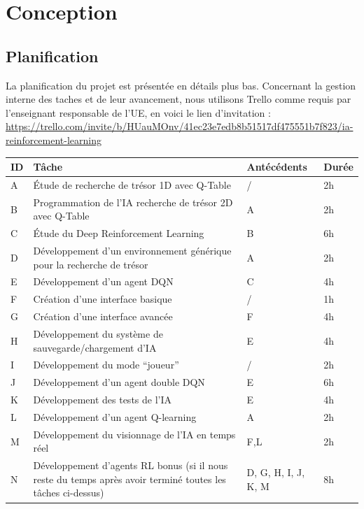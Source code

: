 \chapter{Conception}


\section{Planification}

La planification du projet est présentée en détails plus bas. Concernant la gestion interne des taches et de leur avancement, nous utilisons Trello comme requis par l'enseignant responsable de l'UE, en voici le lien d'invitation : \\ \url{https://trello.com/invite/b/HUauMOnv/41ec23e7edb8b51517df475551b7f823/ia-reinforcement-learning}


\begin{center}
\begin{tabularx}{\linewidth}{|p{1cm}|X|p{2.1cm}|p{1cm}|}
    \hline
    ID & Tâche & Antécédents & Durée \\
    \hline
    \hline
    A & Étude de recherche de trésor 1D avec Q-Table & / & 2h \\
    \hline
    B & Programmation de l'IA recherche de trésor 2D avec Q-Table& A & 2h \\
    \hline
    C & Étude du Deep Reinforcement Learning & B & 6h \\
    \hline
    D & Développement d’un environnement générique pour la recherche de trésor & A & 2h \\
    \hline
    E & Développement d’un agent DQN & C & 4h \\
    \hline
    F & Création d’une interface basique & / & 1h \\
    \hline
    G & Création d’une interface avancée & F & 4h \\
    \hline
    H & Développement du système de sauvegarde/chargement d’IA & E & 4h \\
    \hline
    I & Développement du mode ``joueur'' & / & 2h \\
    \hline
    J & Développement d’un agent double DQN & E & 6h \\
    \hline
    K & Développement des tests de l’IA & E & 4h \\
    \hline
    L & Développement d’un agent Q-learning & A & 2h \\
    \hline
    M & Développement du visionnage de l’IA en temps réel & F,L & 2h \\
    \hline
    N & Développement d’agents  RL bonus (si il nous reste du temps après avoir terminé toutes les tâches ci-dessus) & D, G, H, I, J, K, M & 8h \\
    \hline
\end{tabularx}
\end{center}

